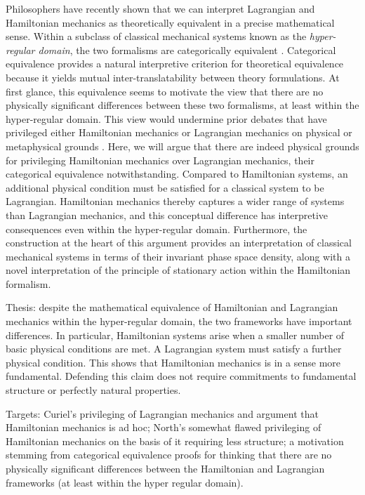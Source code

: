 \documentclass[letterpaper]{article}
\begin{document}
Philosophers have recently shown that we can interpret Lagrangian and Hamiltonian mechanics as theoretically equivalent in a precise mathematical sense. Within a subclass of classical mechanical systems known as the \textit{hyper-regular domain}, the two formalisms are categorically equivalent \parencites[]{Teh2017}{Barrett2018}. Categorical equivalence provides a natural interpretive criterion for theoretical equivalence because it yields mutual inter-translatability between theory formulations. At first glance, this equivalence seems to motivate the view that there are no physically significant differences between these two formalisms, at least within the hyper-regular domain. This view would undermine prior debates that have privileged either Hamiltonian mechanics or Lagrangian mechanics on physical or metaphysical grounds \parencites[]{North2009}{Curiel2014}. Here, we will argue that there are indeed physical grounds for privileging Hamiltonian mechanics over Lagrangian mechanics, their categorical equivalence notwithstanding. Compared to Hamiltonian systems, an additional physical condition must be satisfied for a classical system to be Lagrangian. Hamiltonian mechanics thereby captures a wider range of systems than Lagrangian mechanics, and this conceptual difference has interpretive consequences even within the hyper-regular domain. Furthermore, the construction at the heart of this argument provides an interpretation of classical mechanical systems in terms of their invariant phase space density, along with a novel interpretation of the principle of stationary action within the Hamiltonian formalism.

Thesis: despite the mathematical equivalence of Hamiltonian and Lagrangian mechanics within the hyper-regular domain, the two frameworks have important differences. In particular, Hamiltonian systems arise when a smaller number of basic physical conditions are met. A Lagrangian system must satisfy a further physical condition. This shows that Hamiltonian mechanics is in a sense more fundamental. Defending this claim does not require commitments to fundamental structure or perfectly natural properties.

Targets: Curiel's privileging of Lagrangian mechanics and argument that Hamiltonian mechanics is ad hoc; North's somewhat flawed privileging of Hamiltonian mechanics on the basis of it requiring less structure; a motivation stemming from categorical equivalence proofs for thinking that there are no physically significant differences between the Hamiltonian and Lagrangian frameworks (at least within the hyper regular domain).
\end{document}
